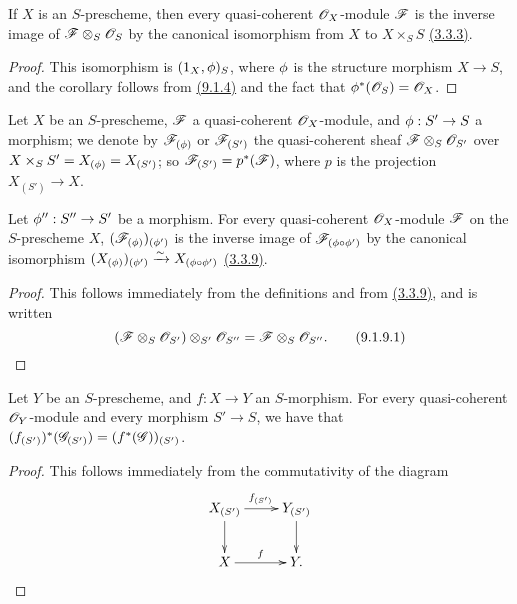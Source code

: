\begin{cor}[9.1.7]
\label{cor-1.9.1.7}
If $X$ is an $S$-prescheme, then every quasi-coherent $\mathscr{O}_X$-module $\mathscr{F}$ is the inverse
image of $\mathscr{F}\otimes_S\mathscr{O}_S$ by the canonical isomorphism from $X$ to $X\times_S S$
\hyperref[prop-1.3.3.3]{(3.3.3)}.
\end{cor}

\begin{proof}
\label{proof-cor-1.9.1.7}
This isomorphism is $(1_X,\phi)_S$, where $\phi$ is the structure morphism
$X\to S$, and the corollary follows from \hyperref[prop-1.9.1.4]{(9.1.4)} and the fact that
$\phi^*(\mathscr{O}_S)=\mathscr{O}_X$.
\end{proof}

\begin{env}[9.1.8]
\label{env-1.9.1.8}
Let $X$ be an $S$-prescheme, $\mathscr{F}$ a quasi-coherent
$\mathscr{O}_X$-module, and $\phi:S'\to S$ a morphism; we denote by
$\mathscr{F}_{(\phi)}$ or $\mathscr{F}_{(S')}$ the quasi-coherent sheaf
$\mathscr{F}\otimes_S\mathscr{O}_{S'}$ over $X\times_S S'=X_{(\phi)}=X_{(S')}$; so
$\mathscr{F}_{(S')}=p^*(\mathscr{F})$, where $p$ is the projection $X_{(S')}\to X$.
\end{env}

\begin{prop}[9.1.9]
\label{prop-1.9.1.9}
Let $\phi'':S''\to S'$ be a morphism.
For every quasi-coherent $\mathscr{O}_X$-module $\mathscr{F}$ on the $S$-prescheme $X$,
$(\mathscr{F}_{(\phi)})_{(\phi')}$ is the inverse image of
$\mathscr{F}_{(\phi\circ\phi')}$ by the canonical isomorphism
$(X_{(\phi)})_{(\phi')}\xrightarrow{\sim} X_{(\phi\circ\phi')}$
\hyperref[prop-1.3.3.9]{(3.3.9)}.
\end{prop}

\begin{proof}
\label{proof-prop-1.9.1.9}
This follows immediately from the definitions and from \hyperref[prop-1.3.3.9]{(3.3.9)}, and is
written
\[
  (\mathscr{F}\otimes_S\mathscr{O}_{S'})\otimes_{S'}\mathscr{O}_{S''}=\mathscr{F}\otimes_S\mathscr{O}_{S''}.
  \tag{9.1.9.1}
\]
\end{proof}

\begin{prop}[9.1.10]
\label{prop-1.9.1.10}
Let $Y$ be an $S$-prescheme, and $f:X\to Y$ an $S$-morphism.
For every quasi-coherent $\mathscr{O}_Y$-module and every morphism
$S'\to S$, we have that
$(f_{(S')})^*(\mathscr{G}_{(S')})=(f^*(\mathscr{G}))_{(S')}$.
\end{prop}

\begin{proof}
\label{proof-prop-1.9.1.10}
This follows immediately from the commutativity of the diagram
\[
  \xymatrix{
    X_{(S')}\ar[r]^{f_{(S')}}\ar[d] & Y_{(S')}\ar[d]\\
    X\ar[r]^f & Y.
  }
\]
\end{proof}


